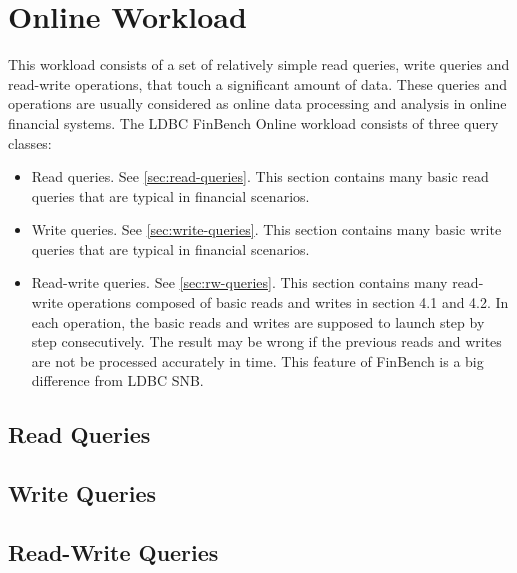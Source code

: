 \chapter{Online Workload}
\label{section:online-workload}

This workload consists of a set of relatively simple read queries, write queries
and read-write operations, that touch a significant amount of data. These
queries and operations are usually considered as online data processing and
analysis in online financial systems. The LDBC FinBench Online workload consists
of three query classes: 
\begin{itemize}
    \item Read queries. See \autoref{sec:read-queries}. This section contains many basic read
    queries that are typical in financial scenarios.
    \item Write queries. See \autoref{sec:write-queries}. This section contains many basic
    write queries that are typical in financial scenarios.
    \item Read-write queries. See \autoref{sec:rw-queries}. This section contains many
    read-write operations composed of basic reads and writes in section 4.1 and
    4.2. In each operation, the basic reads and writes are supposed to launch
    step by step consecutively. The result may be wrong if the previous reads
    and writes are not be processed accurately in time. This feature of FinBench
    is a big difference from LDBC SNB.
\end{itemize}

\section{Read Queries}
\label{sec:read-queries}




\section{Write Queries}
\label{sec:write-queries}




\section{Read-Write Queries}
\label{sec:rw-queries}



